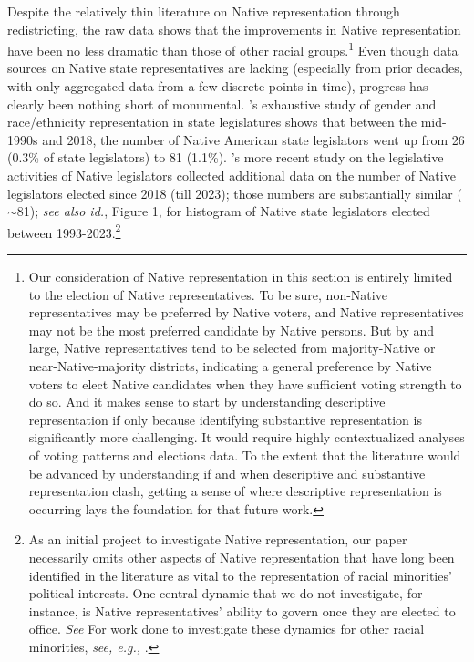 \documentclass[12pt]{article}
\begin{document}
Despite the relatively thin literature on Native representation through redistricting, the raw data shows that the improvements in Native representation have been no less dramatic than those of other racial groups.\footnote{Our consideration of Native representation in this section is entirely limited to the election of Native representatives. To be sure, non-Native representatives may be preferred by Native voters, and Native representatives may not be the most preferred candidate by Native persons. But by and large, Native representatives tend to be selected from majority-Native or near-Native-majority districts, indicating a general preference by Native voters to elect Native candidates when they have sufficient voting strength to do so. And it makes sense to start by understanding descriptive representation if only because identifying substantive representation is significantly more challenging. It would require highly contextualized analyses of voting patterns and elections data. To the extent that the literature would be advanced by understanding if and when descriptive and substantive representation clash, getting a sense of where descriptive representation is occurring lays the foundation for that future work.} Even though data sources on Native state representatives are lacking (especially from prior decades, with only aggregated data from a few discrete points in time), progress has clearly been nothing short of monumental. \cite{reingold2019gender}'s exhaustive study of gender and race/ethnicity representation in state legislatures shows that between the mid-1990s and 2018, the number of Native American state legislators went up from 26 (0.3\% of state legislators) to 81 (1.1\%). \cite{blasingame2025are}'s more recent study on the legislative activities of Native legislators collected additional data on the number of Native legislators elected since 2018 (till 2023); those numbers are substantially similar ($\sim$81); \textit{see also id.}, Figure 1, for histogram of Native state legislators elected between 1993-2023.\footnote{As an initial project to investigate Native representation, our paper necessarily omits other aspects of Native representation that have long been identified in the literature as vital to the representation of racial minorities' political interests.  One central dynamic that we do not investigate, for instance, is Native representatives' ability to govern once they are elected to office. \textit{See} \cite{karlan1993rights} For work done to investigate these dynamics for other racial minorities, \textit{see, e.g.,} \cite{hutchings2004congressional}.}
\end{document}

